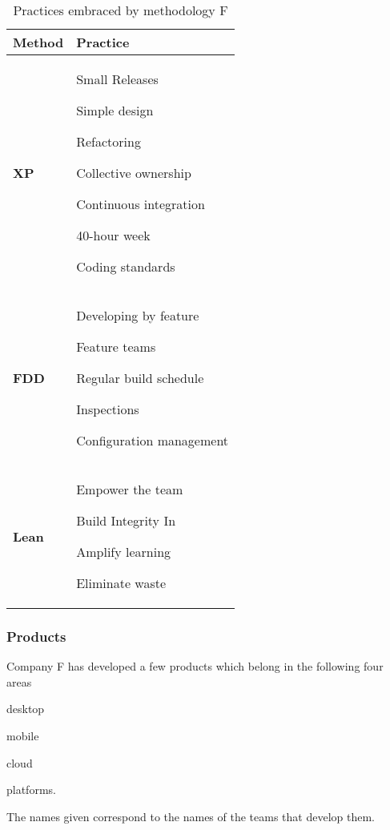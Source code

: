 \begin{table} [H]
\caption{Practices embraced by methodology F}
\begin{tabular}{| p{2cm} | p{13cm}|}
    \hline
     \textbf{Method} & \textbf{Practice} \\ \hline
     \textbf{XP}  & \begin{inparaenum} [a\upshape)]
     				\item Small Releases \item Simple design \item Refactoring \item Collective ownership \item Continuous integration \item 40-hour week \item Coding standards
					\end{inparaenum}      \\ \hline
     \textbf{FDD}  & \begin{inparaenum} [a\upshape)]  \item Developing by feature \item Feature teams \item Regular build schedule \item Inspections \item Configuration management
     				  \end{inparaenum}\\ \hline
     \textbf{Lean} & \begin{inparaenum} [a\upshape)] \item Empower the team \item Build Integrity In \item Amplify learning \item Eliminate waste
     				 \end{inparaenum} \\ \hline
\end{tabular}
\label{table:methodologyF_practices}
\end{table}

\subsubsection{Products}
Company F has developed a few products which belong in the following four areas 
\begin{inparaenum} [a\upshape)]
\item desktop
\item mobile
\item cloud
\item platforms.
\end{inparaenum}
The names given correspond to the names of the teams that develop them.

